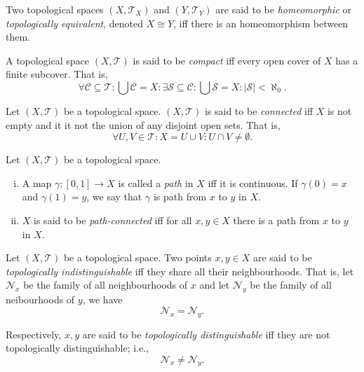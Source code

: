 \begin{definition}
	[homeomorphic]
	\label{def: homomorphisms}
	Two topological spaces $(X, \mathcal T_X)$ and $(Y, \mathcal T_Y)$ are said to be \textit{homeomorphic} or \textit{topologically equivalent}, denoted $X \cong Y$, iff there is an homeomorphism between them.
\end{definition}


\begin{definition}
	[compactness]
	\label{def: compactness}
	A topological space $(X, \mathcal T)$ is said to be \textit{compact} iff every open cover of $X$ has a finite subcover. That is,
	$$
	\forall \mathcal C \subseteq \mathcal T : \bigcup \mathcal C = X : \exists \mathcal S \subseteq \mathcal C : \bigcup \mathcal S = X : |\mathcal S| < \aleph_0.
	$$
\end{definition}


\begin{definition}
	[connectedness]
	\label{def: connectedness}
	Let $(X, \mathcal T)$ be a topological space. $(X, \mathcal T)$ is said to be \textit{connected} iff $X$ is not empty and it it not the union of any disjoint open sets. That is,
	$$
	\forall U, V \in \mathcal T : X = U \cup V : U \cap V \ne \emptyset.
	$$
\end{definition}


\begin{definition}
	\label{def: path-connectedness}
	Let $(X, \mathcal T)$ be a topological space.
	\begin{enumerate}[(i)]
		\item A map $\gamma: [0,1] \to X$ is called a \textit{path} in $X$ iff it is continuous. If $\gamma(0) = x$ and $\gamma(1)=y$, we say that $\gamma$ is path from $x$ to $y$ in $X$.
		\item $X$ is said to be \textit{path-connected} iff for all $x, y \in X$ there is a path from $x$ to $y$ in $X$.
	\end{enumerate}
\end{definition}


\begin{definition}
	\label{def: topologically indistinguishable}
	Let $(X, \mathcal T)$ be a topological space. Two points $x,y \in X$ are said to be \textit{topologically indistinguishable} iff they share all their neighbourhoods. That is, let $\mathcal N_x$ be the family of all neighbourhoods of $x$ and let $\mathcal N_y$ be the family of all neibourhoods of $y$, we have
	$$
	\mathcal N_x = \mathcal N_y.
	$$
	
	Respectively, $x,y$ are said to be \textit{topologically distinguishable} iff they are not topologically distinguishable; i.e.,
	$$
	\mathcal N_x \ne \mathcal N_y.
	$$
\end{definition}


